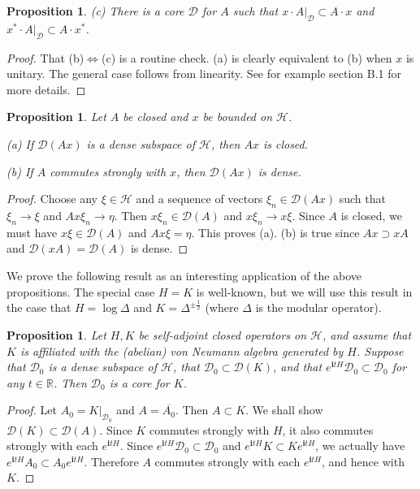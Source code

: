 \documentclass[12pt,a4paper]{article}
\theoremstyle{definition}
\theoremstyle{plain}
\newtheorem{pp}[df]{Proposition}
\newcommand{\mc}{\mathcal}
\newcommand{\ovl}{\overline}
\newcommand{\Dom}{\scr D}
\newcommand{\scr}{\mathscr}
\newcommand{\im}{\mathbf{i}}
\newcommand{\mbb}{\mathbb}
\numberwithin{equation}{subsection}
\begin{document}
\begin{subappendices}
\begin{pp}
	(c) There is a core $\Dom$ for $A$ such that $x\cdot A|_\Dom\subset A\cdot x$ and $x^*\cdot A|_\Dom\subset A\cdot x^*$. 
\end{pp}

\begin{proof}
	That (b)$\Longleftrightarrow$(c) is a routine check.  (a) is clearly equivalent to (b) when $x$ is unitary. The general case follows from linearity. See for example \cite{Gui19a} section B.1 for more details.
\end{proof}


\begin{pp}\label{lb16}
	Let $A$ be closed and $x$ be bounded on $\mc H$.
	
	(a) If $\Dom(Ax)$ is a dense subspace of $\mc H$, then $Ax$ is closed.
	
	(b) If $A$ commutes strongly with $x$, then $\Dom(Ax)$ is dense.
\end{pp}

\begin{proof}
	Choose any $\xi\in\mc H$ and a sequence of vectors $\xi_n\in\Dom(Ax)$ such that  $\xi_n\rightarrow\xi$ and $Ax\xi_n\rightarrow\eta$. Then $x\xi_n\in\Dom(A)$ and $x\xi_n\rightarrow x\xi$. Since $A$ is closed, we must have $x\xi\in\Dom(A)$ and $Ax\xi=\eta$. This proves (a). (b) is true since $Ax\supset xA$ and $\Dom(xA)=\Dom(A)$ is dense.
\end{proof}



We prove the following result as an interesting application of the above propositions. The special case $H=K$ is well-known, but we will use this result in the case that  $H=\log\Delta$ and $K=\Delta^{\pm\frac 12}$ (where $\Delta$ is the modular operator). 

\begin{pp}\label{lb38}
	Let $H,K$ be  self-adjoint closed operators on $\mc H$, and assume that $K$ is  affiliated with the (abelian) von Neumann algebra generated by $H$. Suppose that $\scr D_0$ is a dense subspace of $\mc H$, that $\scr D_0\subset\Dom(K)$, and that $e^{\im tH}\scr D_0\subset\scr D_0$ for any $t\in\mbb R$. Then $\scr D_0$ is a core for $K$.
\end{pp}

\begin{proof}
	Let $A_0=K|_{\scr D_0}$ and $A=\ovl{A_0}$. Then $A\subset K$. We shall show $\Dom(K)\subset\Dom(A)$. Since $K$ commutes strongly with $H$, it also commutes strongly with each $e^{\im tH}$. Since  $e^{\im tH}\scr D_0\subset\scr D_0$ and $e^{\im tH}K\subset Ke^{\im tH}$, we actually have $e^{\im tH}A_0\subset A_0e^{\im tH}$. Therefore $A$ commutes strongly with each $e^{\im tH}$, and hence with $K$.
	

\end{proof}
\end{subappendices}
\end{document}
